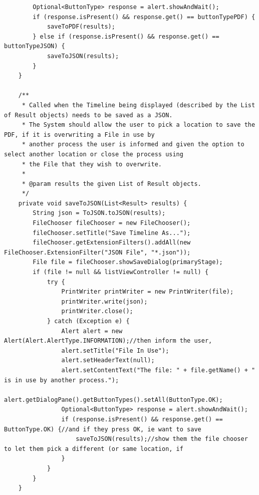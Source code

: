 \begin{lstlisting}
        Optional<ButtonType> response = alert.showAndWait();
        if (response.isPresent() && response.get() == buttonTypePDF) {
            saveToPDF(results);
        } else if (response.isPresent() && response.get() == buttonTypeJSON) {
            saveToJSON(results);
        }
    }

    /**
     * Called when the Timeline being displayed (described by the List of Result objects) needs to be saved as a JSON.
     * The System should allow the user to pick a location to save the PDF, if it is overwriting a File in use by
     * another process the user is informed and given the option to select another location or close the process using
     * the File that they wish to overwrite.
     *
     * @param results the given List of Result objects.
     */
    private void saveToJSON(List<Result> results) {
        String json = ToJSON.toJSON(results);
        FileChooser fileChooser = new FileChooser();
        fileChooser.setTitle("Save Timeline As...");
        fileChooser.getExtensionFilters().addAll(new FileChooser.ExtensionFilter("JSON File", "*.json"));
        File file = fileChooser.showSaveDialog(primaryStage);
        if (file != null && listViewController != null) {
            try {
                PrintWriter printWriter = new PrintWriter(file);
                printWriter.write(json);
                printWriter.close();
            } catch (Exception e) {
                Alert alert = new Alert(Alert.AlertType.INFORMATION);//then inform the user,
                alert.setTitle("File In Use");
                alert.setHeaderText(null);
                alert.setContentText("The file: " + file.getName() + " is in use by another process.");
                alert.getDialogPane().getButtonTypes().setAll(ButtonType.OK);
                Optional<ButtonType> response = alert.showAndWait();
                if (response.isPresent() && response.get() == ButtonType.OK) {//and if they press OK, ie want to save
                    saveToJSON(results);//show them the file chooser to let them pick a different (or same location, if
                }
            }
        }
    }


\end{lstlisting}
